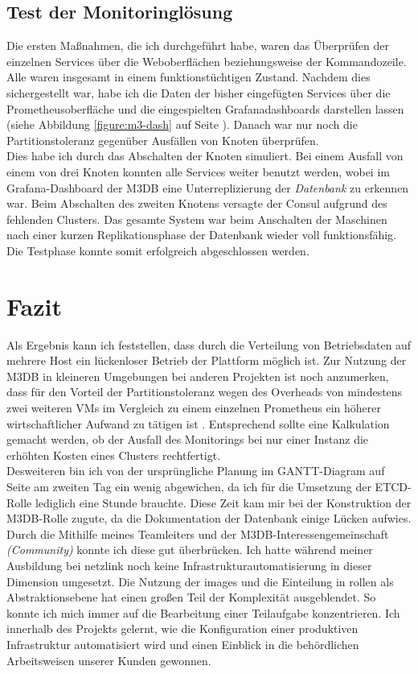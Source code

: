 \documentclass[11pt,a4paper]{article}
\begin{document}
\subsection{Test der Monitoringlösung}
Die ersten Maßnahmen, die ich durchgeführt habe, waren das Überprüfen der einzelnen
Services über die Weboberflächen beziehungsweise der Kommandozeile. Alle waren insgesamt
in einem funktionstüchtigen Zustand. Nachdem dies sichergestellt war, habe ich
die Daten der bisher eingefügten Services über die Prometheusoberfläche und
die eingespielten Grafanadashboards darstellen lassen (siehe Abbildung \ref{figure:m3-dash} auf
Seite \pageref{figure:m3-dash}). Danach war nur noch die
Partitionstoleranz gegenüber Ausfällen von Knoten überprüfen. \\
Dies habe ich durch das Abschalten der Knoten simuliert. Bei einem Ausfall von
einem von drei Knoten konnten alle Services weiter benutzt werden, wobei im
Grafana-Dashboard der M3DB eine Unterreplizierung der \emph{Datenbank}
zu erkennen war. Beim Abschalten des zweiten Knotens versagte der Consul
aufgrund des fehlenden Clusters. Das gesamte System war beim
Anschalten der Maschinen nach einer kurzen Replikationsphase der Datenbank wieder voll funktionsfähig.
Die Testphase konnte somit erfolgreich abgeschlossen werden.
\section{Fazit}
Als Ergebnis kann ich feststellen, dass durch die Verteilung von Betriebsdaten auf mehrere Host ein lückenloser
Betrieb der Plattform möglich ist. Zur Nutzung der M3DB in kleineren Umgebungen bei anderen Projekten ist noch
anzumerken, dass für den Vorteil der Partitionstoleranz wegen des Overheads von mindestens zwei
weiteren VMs im Vergleich zu einem einzelnen Prometheus ein höherer wirtschaftlicher
Aufwand zu tätigen ist \cite{m3db-vid}. Entsprechend sollte eine Kalkulation gemacht werden, ob
der Ausfall des Monitorings bei nur einer Instanz die erhöhten Kosten eines Clusters rechtfertigt.
\\
Desweiteren bin ich von der ursprüngliche Planung im GANTT-Diagram auf Seite \pageref{table:gantt}
am zweiten Tag ein wenig abgewichen, da ich für die Umsetzung der ETCD-Rolle lediglich eine Stunde
brauchte. Diese Zeit kam mir bei der Konstruktion der M3DB-Rolle zugute, da die Dokumentation der Datenbank
einige Lücken aufwies. Durch die Mithilfe meines Teamleiters und der
M3DB-Interessengemeinschaft \emph{(Community)} konnte ich diese gut überbrücken.
Ich hatte während meiner Ausbildung bei \gls{netzlink} noch keine Infrastrukturautomatisierung
in dieser Dimension umgesetzt.
Die Nutzung der \gls{images} und die Einteilung in \gls{rollen} als Abstraktionsebene hat einen großen Teil der Komplexität
ausgeblendet. So konnte ich mich immer auf die Bearbeitung einer Teilaufgabe konzentrieren.
Ich innerhalb des Projekts gelernt, wie die Konfiguration einer produktiven Infrastruktur
automatisiert wird und einen Einblick in die behördlichen Arbeitsweisen unserer Kunden gewonnen.
\\
\newpage
\printnoidxglossaries
\end{document}
